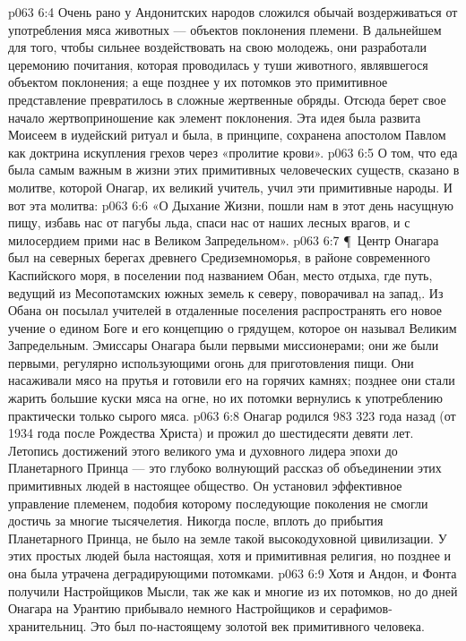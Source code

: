 \vs p063 6:4 Очень рано у Андонитских народов сложился обычай воздерживаться от употребления мяса животных --- объектов поклонения племени. В дальнейшем для того, чтобы сильнее воздействовать на свою молодежь, они разработали церемонию почитания, которая проводилась у туши животного, являвшегося объектом поклонения; а еще позднее у их потомков это примитивное представление превратилось в сложные жертвенные обряды. Отсюда берет свое начало жертвоприношение как элемент поклонения. Эта идея была развита Моисеем в иудейский ритуал и была, в принципе, сохранена апостолом Павлом как доктрина искупления грехов через «пролитие крови».
\vs p063 6:5 О том, что еда была самым важным в жизни этих примитивных человеческих существ, сказано в молитве, которой Онагар, их великий учитель, учил эти примитивные народы. И вот эта молитва:
\vs p063 6:6 «О Дыхание Жизни, пошли нам в этот день насущную пищу, избавь нас от пагубы льда, спаси нас от наших лесных врагов, и с милосердием прими нас в Великом Запредельном».
\vs p063 6:7 \P\ Центр Онагара был на северных берегах древнего Средиземноморья, в районе современного Каспийского моря, в поселении под названием Обан, место отдыха, где путь, ведущий из Месопотамских южных земель к северу, поворачивал на запад,. Из Обана он посылал учителей в отдаленные поселения распространять его новое учение о едином Боге и его концепцию о грядущем, которое он называл Великим Запредельным. Эмиссары Онагара были первыми миссионерами; они же были первыми, регулярно использующими огонь для приготовления пищи. Они насаживали мясо на прутья и готовили его на горячих камнях; позднее они стали жарить большие куски мяса на огне, но их потомки вернулись к употреблению практически только сырого мяса.
\vs p063 6:8 Онагар родился 983 323 года назад (от 1934 года после Рождества Христа) и прожил до шестидесяти девяти лет. Летопись достижений этого великого ума и духовного лидера эпохи до Планетарного Принца --- это глубоко волнующий рассказ об объединении этих примитивных людей в настоящее общество. Он установил эффективное управление племенем, подобия которому последующие поколения не смогли достичь за многие тысячелетия. Никогда после, вплоть до прибытия Планетарного Принца, не было на земле такой высокодуховной цивилизации. У этих простых людей была настоящая, хотя и примитивная религия, но позднее и она была утрачена деградирующими потомками.
\vs p063 6:9 Хотя и Андон, и Фонта получили Настройщиков Мысли, так же как и многие из их потомков, но до дней Онагара на Урантию прибывало немного Настройщиков и серафимов\hyp{}хранительниц. Это был по\hyp{}настоящему золотой век примитивного человека.

